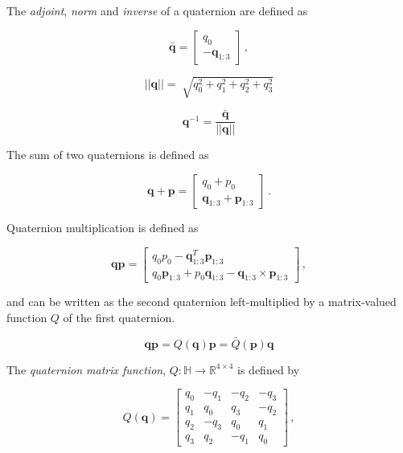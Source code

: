 The \emph{adjoint}, \emph{norm} and \emph{inverse} of a quaternion are defined as

\begin{equation}
  \bar{\mathbf{q}} = \begin{bmatrix}
  	q_0 \\ -\mathbf{q}_{1:3} 
  \end{bmatrix}\,,
\end{equation}

\begin{equation}
  ||\mathbf{q}|| = \sqrt[]{q_0^2 + q_1^2 + q_2^2 + q_3^2}
\end{equation}

\begin{equation}
	\mathbf{q}^{-1} = \frac{\bar{\mathbf{q}}}{||\mathbf{q}||}
\end{equation}

The sum of two quaternions is defined as

\begin{equation}
  \mathbf{q} + \mathbf{p} = \begin{bmatrix}
  	q_0 + p_0 \\ \mathbf{q}_{1:3} + \mathbf{p}_{1:3}
  \end{bmatrix}\,.
\end{equation}

Quaternion multiplication is defined as

\begin{equation}
  \mathbf{q} \mathbf{p} = \begin{bmatrix}
  	q_0 p_0 -\mathbf{q}^T_{1:3} \mathbf{p}_{1:3}\\
  	q_0 \mathbf{p}_{1:3} + p_0 \mathbf{q}_{1:3} - \mathbf{q}_{1:3} \times \mathbf{p}_{1:3}
  \end{bmatrix}\,,
\end{equation}

\noindent
and can be written as the second quaternion left-multiplied by a matrix-valued function $Q$ of the first quaternion.

\begin{equation}
  \mathbf{q} \mathbf{p} = Q(\mathbf{q}) \mathbf{p} = \bar{Q}(\mathbf{p}) \mathbf{q}
\end{equation}

\noindent
The \emph{quaternion matrix function}, $Q : \mathbb{H} \rightarrow \mathbb{R}^{4\times4}$ is defined by

\begin{equation}
	Q(\mathbf{q}) = \begin{bmatrix}
 q_0 & -q_1 & -q_2 & -q_3\\
 q_1 & q_0 & q_3 & -q_2\\
 q_2 & -q_3 & q_0 & q_1 \\
 q_3 & q_2 & -q_1 & q_0
\end{bmatrix}\,,
\end{equation}

